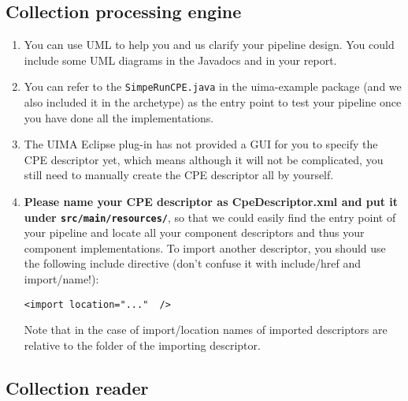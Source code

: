 \subsection{Collection processing engine}

\begin{enumerate}

\item You can use UML to help you and us clarify your pipeline design. You could
include some UML diagrams in the Javadocs and in your report.

\item You can refer to the \texttt{SimpeRunCPE.java} in the uima-example package
(and we also included it in the archetype) as the entry point to test your
pipeline once you have done all the implementations.

\item The UIMA Eclipse plug-in has not provided a GUI for you to specify the CPE
descriptor yet, which means although it will not be complicated, you still need to
manually create the CPE descriptor all by yourself.

\item \textbf{Please name your CPE descriptor as CpeDescriptor.xml and put it
under \texttt{src/main/resources/}}, so that we could easily find the entry point
of your pipeline and locate all your component descriptors and thus your
component implementations.
To import another descriptor, you should use the following include directive (don't
confuse it with include/href and import/name!):
\begin{verbatim}
<import location="..."  />
\end{verbatim}
Note that in the case of import/location
names of imported descriptors are relative to the folder of the importing descriptor.

\end{enumerate}

\subsection{Collection reader}

